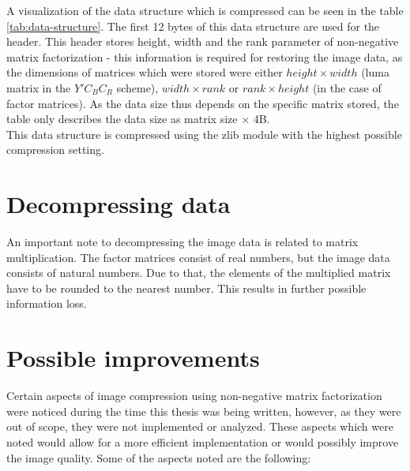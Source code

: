 \documentclass[thesis=M,english]{FITthesis}[2012/10/20]
\begin{document}
A visualization of the data structure which is compressed can be seen in the
table \ref{tab:data-structure}. The first 12 bytes of this data structure
are used for the header. This header stores height, width and the rank parameter
of non-negative matrix factorization - this information is required for restoring
the image data, as the dimensions of matrices which were stored were either
$height \times width$ (luma matrix in the $Y'C_BC_R$ scheme), $width \times rank$
or $rank \times height$ (in the case of factor matrices). As the data size thus
depends on the specific matrix stored, the table only describes the data size
as matrix size $\times$ 4B.
\\

This data structure is compressed using the zlib module with the highest possible
compression setting.


\section{Decompressing data}
An important note to decompressing the image data is related to matrix multiplication.
The factor matrices consist of real numbers, but the image data consists of natural numbers.
Due to that, the elements of the multiplied matrix have to be rounded to the nearest number.
This results in further possible information loss.


\section{Possible improvements}
Certain aspects of image compression using non-negative matrix factorization
were noticed during the time this thesis was being written, however, as
they were out of scope, they were not implemented or analyzed. These
aspects which were noted would allow for a more efficient implementation
or would possibly improve the image quality. Some of the aspects
noted are the following:
\end{document}
